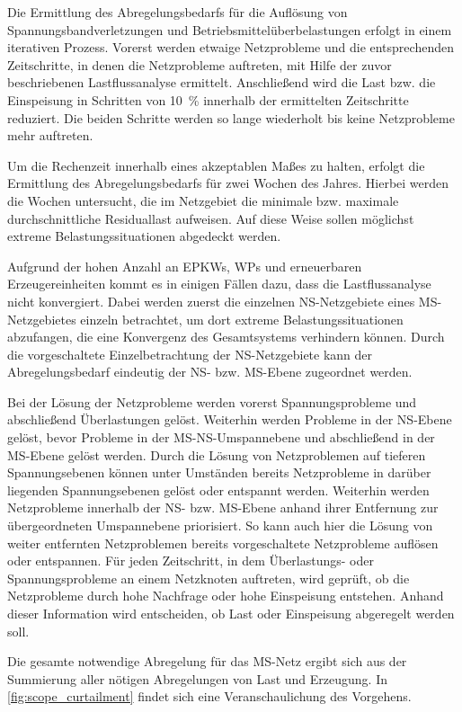 Die Ermittlung des Abregelungsbedarfs für die Auflösung von Spannungsbandverletzungen und Betriebsmittelüberbelastungen erfolgt in einem iterativen Prozess.
Vorerst werden etwaige Netzprobleme und die entsprechenden Zeitschritte, in denen die Netzprobleme auftreten, mit Hilfe der zuvor beschriebenen Lastflussanalyse ermittelt.
Anschließend wird die Last bzw. die Einspeisung in Schritten von \SI{10}{\percent} innerhalb der ermittelten Zeitschritte reduziert.
Die beiden Schritte werden so lange wiederholt bis keine Netzprobleme mehr auftreten.\medskip

Um die Rechenzeit innerhalb eines akzeptablen Maßes zu halten, erfolgt die Ermittlung des Abregelungsbedarfs für zwei Wochen des Jahres.
Hierbei werden die Wochen untersucht, die im Netzgebiet die minimale bzw. maximale durchschnittliche Residuallast aufweisen.
Auf diese Weise sollen möglichst extreme Belastungssituationen abgedeckt werden.\medskip

Aufgrund der hohen Anzahl an \glspl{EPKW}, \glspl{WP} und erneuerbaren Erzeugereinheiten kommt es in einigen Fällen dazu, dass die Lastflussanalyse nicht konvergiert.
Dabei werden zuerst die einzelnen \gls{NS}-Netzgebiete eines \gls{MS}-Netzgebietes einzeln betrachtet, um dort extreme Belastungssituationen abzufangen, die eine Konvergenz des Gesamtsystems verhindern können.
Durch die vorgeschaltete Einzelbetrachtung der \gls{NS}-Netzgebiete kann der Abregelungsbedarf eindeutig der \gls{NS}- bzw. \gls{MS}-Ebene zugeordnet werden.\medskip

Bei der Lösung der Netzprobleme werden vorerst Spannungsprobleme und abschließend Überlastungen gelöst.
Weiterhin werden Probleme in der \gls{NS}-Ebene gelöst, bevor Probleme in der \gls{MS}-\gls{NS}-Umspannebene und abschließend in der \gls{MS}-Ebene gelöst werden.
Durch die Lösung von Netzproblemen auf tieferen Spannungsebenen können unter Umständen bereits Netzprobleme in darüber liegenden Spannungsebenen gelöst oder entspannt werden.
Weiterhin werden Netzprobleme innerhalb der \gls{NS}- bzw. \gls{MS}-Ebene anhand ihrer Entfernung zur übergeordneten Umspannebene priorisiert.
So kann auch hier die Lösung von weiter entfernten Netzproblemen bereits vorgeschaltete Netzprobleme auflösen oder entspannen.
Für jeden Zeitschritt, in dem Überlastungs- oder Spannungsprobleme an einem Netzknoten auftreten, wird geprüft, ob die Netzprobleme durch hohe Nachfrage oder hohe Einspeisung entstehen.
Anhand dieser Information wird entscheiden, ob Last oder Einspeisung abgeregelt werden soll.\medskip

Die gesamte notwendige Abregelung für das \gls{MS}-Netz ergibt sich aus der Summierung aller nötigen Abregelungen von Last und Erzeugung.
In \autoref{fig:scope_curtailment} findet sich eine Veranschaulichung des Vorgehens.




\clearpage

